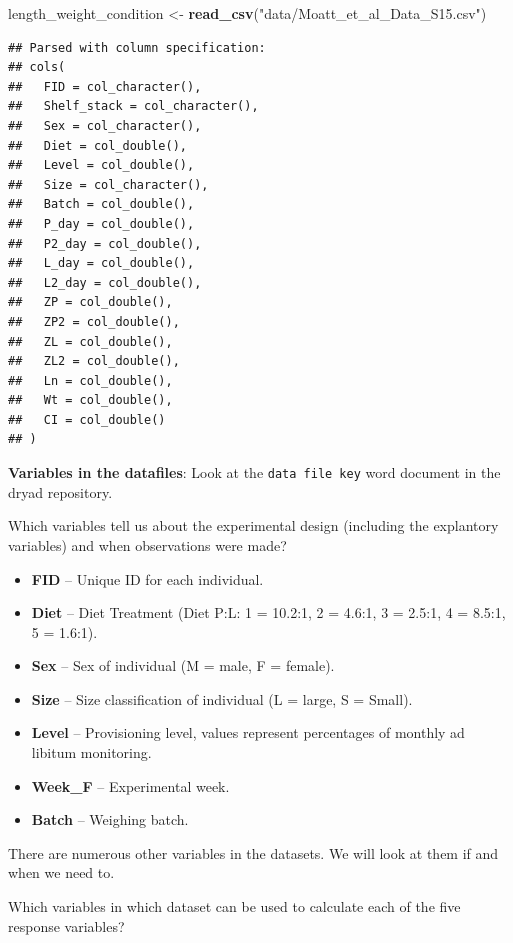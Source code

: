 \documentclass[]{book}
\newenvironment{Shaded}{\begin{snugshade}}{\end{snugshade}}
\newcommand{\KeywordTok}[1]{\textcolor[rgb]{0.13,0.29,0.53}{\textbf{#1}}}
\newcommand{\NormalTok}[1]{#1}
\newcommand{\StringTok}[1]{\textcolor[rgb]{0.31,0.60,0.02}{#1}}
\providecommand{\tightlist}{%
  \setlength{\itemsep}{0pt}\setlength{\parskip}{0pt}}
\begin{document}
\begin{Shaded}
\begin{Highlighting}[]
\NormalTok{length_weight_condition <-}\StringTok{ }\KeywordTok{read_csv}\NormalTok{(}\StringTok{"data/Moatt_et_al_Data_S15.csv"}\NormalTok{)}
\end{Highlighting}
\end{Shaded}

\begin{verbatim}
## Parsed with column specification:
## cols(
##   FID = col_character(),
##   Shelf_stack = col_character(),
##   Sex = col_character(),
##   Diet = col_double(),
##   Level = col_double(),
##   Size = col_character(),
##   Batch = col_double(),
##   P_day = col_double(),
##   P2_day = col_double(),
##   L_day = col_double(),
##   L2_day = col_double(),
##   ZP = col_double(),
##   ZP2 = col_double(),
##   ZL = col_double(),
##   ZL2 = col_double(),
##   Ln = col_double(),
##   Wt = col_double(),
##   CI = col_double()
## )
\end{verbatim}

\textbf{Variables in the datafiles}: Look at the \texttt{data\ file\ key} word document in the dryad repository.

Which variables tell us about the experimental design (including the explantory variables) and when observations were made?

\begin{itemize}
\tightlist
\item
  \textbf{FID} -- Unique ID for each individual.
\item
  \textbf{Diet} -- Diet Treatment (Diet P:L: 1 = 10.2:1, 2 = 4.6:1, 3 = 2.5:1, 4 = 8.5:1, 5 = 1.6:1).
\item
  \textbf{Sex} -- Sex of individual (M = male, F = female).
\item
  \textbf{Size} -- Size classification of individual (L = large, S = Small).
\item
  \textbf{Level} -- Provisioning level, values represent percentages of monthly ad libitum monitoring.
\item
  \textbf{Week\_F} -- Experimental week.
\item
  \textbf{Batch} -- Weighing batch.
\end{itemize}

There are numerous other variables in the datasets. We will look at them if and when we need to.

Which variables in which dataset can be used to calculate each of the five response variables?
\end{document}
